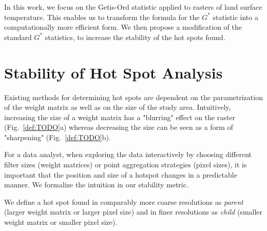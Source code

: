 \documentclass{itatnew}
\begin{document}
In this work, we focus on the Getis-Ord statistic applied to rasters of land
surface temperature. This enables us to transform the formula for the $G^*$
statistic into a computationally more efficient form. We then propose a
modification of the standard $G^*$ statistics, to increase the stability of the
hot spots found.

\section{Stability of Hot Spot Analysis}
\label{sec:Metric}

Existing methods for determining hot spots are dependent on the parametrization
of the weight matrix as well as on the size of the study area. Intuitively,
increasing the size of a weight matrix has a "blurring" effect on the raster
(Fig.~\ref{def:TODO}a) whereas decreasing the size can be seen as a form of
"sharpening" (Fig.~\ref{def:TODO}b).



For a data analyst, when exploring the data interactively by choosing different
filter sizes (weight matrices) or point aggregation strategies (pixel sizes), it
is important that the position and size of a hotspot changes in a predictable
manner. We formalize the intuition in our stability metric.

%
%
%  


We define a hot spot found in comparably more coarse resolutions as
\emph{parent} (larger weight matrix or larger pixel size) and in finer
resolutions as \emph{child} (smaller weight matrix or smaller pixel size).
\end{document}
